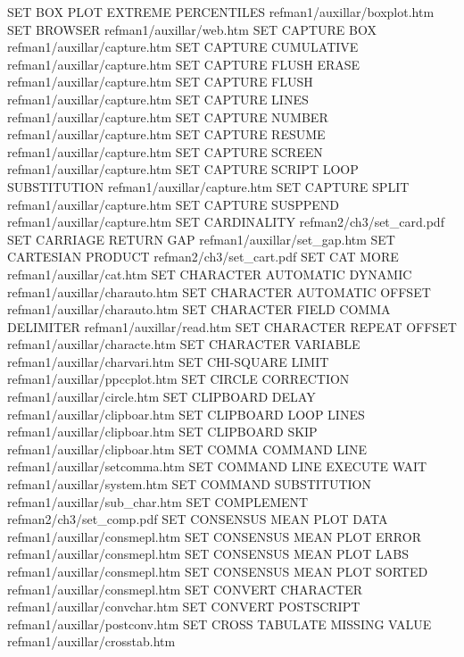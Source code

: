 SET BOX PLOT EXTREME PERCENTILES        refman1/auxillar/boxplot.htm
SET BROWSER                             refman1/auxillar/web.htm
SET CAPTURE BOX                         refman1/auxillar/capture.htm
SET CAPTURE CUMULATIVE                  refman1/auxillar/capture.htm
SET CAPTURE FLUSH ERASE                 refman1/auxillar/capture.htm
SET CAPTURE FLUSH                       refman1/auxillar/capture.htm
SET CAPTURE LINES                       refman1/auxillar/capture.htm
SET CAPTURE NUMBER                      refman1/auxillar/capture.htm
SET CAPTURE RESUME                      refman1/auxillar/capture.htm
SET CAPTURE SCREEN                      refman1/auxillar/capture.htm
SET CAPTURE SCRIPT LOOP SUBSTITUTION    refman1/auxillar/capture.htm
SET CAPTURE SPLIT                       refman1/auxillar/capture.htm
SET CAPTURE SUSPPEND                    refman1/auxillar/capture.htm
SET CARDINALITY                         refman2/ch3/set_card.pdf
SET CARRIAGE RETURN GAP                 refman1/auxillar/set_gap.htm
SET CARTESIAN PRODUCT                   refman2/ch3/set_cart.pdf
SET CAT MORE                            refman1/auxillar/cat.htm
SET CHARACTER AUTOMATIC DYNAMIC         refman1/auxillar/charauto.htm
SET CHARACTER AUTOMATIC OFFSET          refman1/auxillar/charauto.htm
SET CHARACTER FIELD COMMA DELIMITER     refman1/auxillar/read.htm
SET CHARACTER REPEAT OFFSET             refman1/auxillar/characte.htm
SET CHARACTER VARIABLE                  refman1/auxillar/charvari.htm
SET CHI-SQUARE LIMIT                    refman1/auxillar/ppccplot.htm
SET CIRCLE CORRECTION                   refman1/auxillar/circle.htm
SET CLIPBOARD DELAY                     refman1/auxillar/clipboar.htm
SET CLIPBOARD LOOP LINES                refman1/auxillar/clipboar.htm
SET CLIPBOARD SKIP                      refman1/auxillar/clipboar.htm
SET COMMA COMMAND LINE                  refman1/auxillar/setcomma.htm
SET COMMAND LINE EXECUTE WAIT           refman1/auxillar/system.htm
SET COMMAND SUBSTITUTION                refman1/auxillar/sub_char.htm
SET COMPLEMENT                          refman2/ch3/set_comp.pdf
SET CONSENSUS MEAN PLOT DATA            refman1/auxillar/consmepl.htm
SET CONSENSUS MEAN PLOT ERROR           refman1/auxillar/consmepl.htm
SET CONSENSUS MEAN PLOT LABS            refman1/auxillar/consmepl.htm
SET CONSENSUS MEAN PLOT SORTED          refman1/auxillar/consmepl.htm
SET CONVERT CHARACTER                   refman1/auxillar/convchar.htm
SET CONVERT POSTSCRIPT                  refman1/auxillar/postconv.htm
SET CROSS TABULATE MISSING VALUE        refman1/auxillar/crosstab.htm
